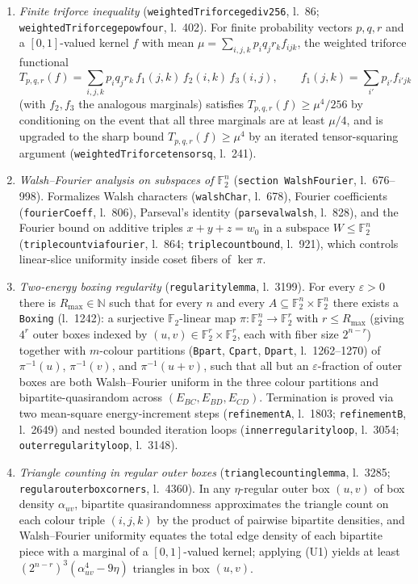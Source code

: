 \documentclass[11pt,reqno]{amsart}
\theoremstyle{remark}
\newcommand{\F}{\mathbb{F}}
\newcommand{\N}{\mathbb{N}}
\newcommand{\LeanUS}{\textunderscore\hspace{0pt}}
\newcommand{\lean}[1]{{\let\_\LeanUS\texttt{#1}}}
\begin{document}
\begin{enumerate}[label=(U\arabic*),leftmargin=2.6em]
\item \emph{Finite triforce inequality} (\lean{weightedTriforce\_ge\_div\_256}, l.~86; \lean{weightedTriforce\_ge\_pow\_\allowbreak four}, l.~402). For finite probability vectors $p, q, r$ and a $[0, 1]$-valued kernel $f$ with mean $\mu = \sum_{i,j,k} p_i q_j r_k f_{ijk}$, the weighted triforce functional
\[
  T_{p,q,r}(f) = \sum_{i,j,k} p_i q_j r_k\, f_1(j, k)\, f_2(i, k)\, f_3(i, j), \qquad f_1(j, k) = \sum_{i'} p_{i'} f_{i'jk}
\]
(with $f_2, f_3$ the analogous marginals) satisfies $T_{p,q,r}(f) \ge \mu^4 / 256$ by conditioning on the event that all three marginals are at least $\mu / 4$, and is upgraded to the sharp bound $T_{p,q,r}(f) \ge \mu^4$ by an iterated tensor-squaring argument (\lean{weightedTriforce\_tensor\_sq}, l.~241).
\item \emph{Walsh--Fourier analysis on subspaces of $\F_2^n$} (\lean{section WalshFourier}, l.~676--998). Formalizes Walsh characters (\lean{walshChar}, l.~678), Fourier coefficients (\lean{fourierCoeff}, l.~806), Parseval's identity (\lean{parseval\_walsh}, l.~828), and the Fourier bound on additive triples $x + y + z = w_0$ in a subspace $W \le \F_2^n$ (\lean{triple\_\allowbreak count\_via\_fourier}, l.~864; \lean{triple\_count\_bound}, l.~921), which controls linear-slice uniformity inside coset fibers of $\ker \pi$.
\item \emph{Two-energy boxing regularity} (\lean{regularity\_lemma}, l.~3199). For every $\varepsilon > 0$ there is $R_{\max} \in \N$ such that for every $n$ and every $A \subseteq \F_2^n \times \F_2^n$ there exists a \lean{Boxing} (l.~1242): a surjective $\F_2$-linear map $\pi : \F_2^n \to \F_2^r$ with $r \le R_{\max}$ (giving $4^r$ outer boxes indexed by $(u, v) \in \F_2^r \times \F_2^r$, each with fiber size $2^{n-r}$) together with $m$-colour partitions (\lean{Bpart}, \lean{Cpart}, \lean{Dpart}, l.~1262--1270) of $\pi^{-1}(u)$, $\pi^{-1}(v)$, and $\pi^{-1}(u + v)$, such that all but an $\varepsilon$-fraction of outer boxes are both Walsh--Fourier uniform in the three colour partitions and bipartite-quasirandom across $(E_{BC}, E_{BD}, E_{CD})$. Termination is proved via two mean-square energy-increment steps (\lean{refinement\_A}, l.~1803; \lean{refinement\_B}, l.~2649) and nested bounded iteration loops (\lean{inner\_regularity\_loop}, l.~3054; \lean{outer\_regularity\_loop}, l.~3148).
\item \emph{Triangle counting in regular outer boxes} (\lean{triangle\_counting\_lemma}, l.~3285; \lean{regular\_outer\_\allowbreak box\_corners}, l.~4360). In any $\eta$-regular outer box $(u, v)$ of box density $\alpha_{uv}$, bipartite quasirandomness approximates the triangle count on each colour triple $(i, j, k)$ by the product of pairwise bipartite densities, and Walsh--Fourier uniformity equates the total edge density of each bipartite piece with a marginal of a $[0, 1]$-valued kernel; applying (U1) yields at least $(2^{n-r})^3 (\alpha_{uv}^4 - 9\eta)$ triangles in box $(u, v)$.

\end{enumerate}
\end{document}
